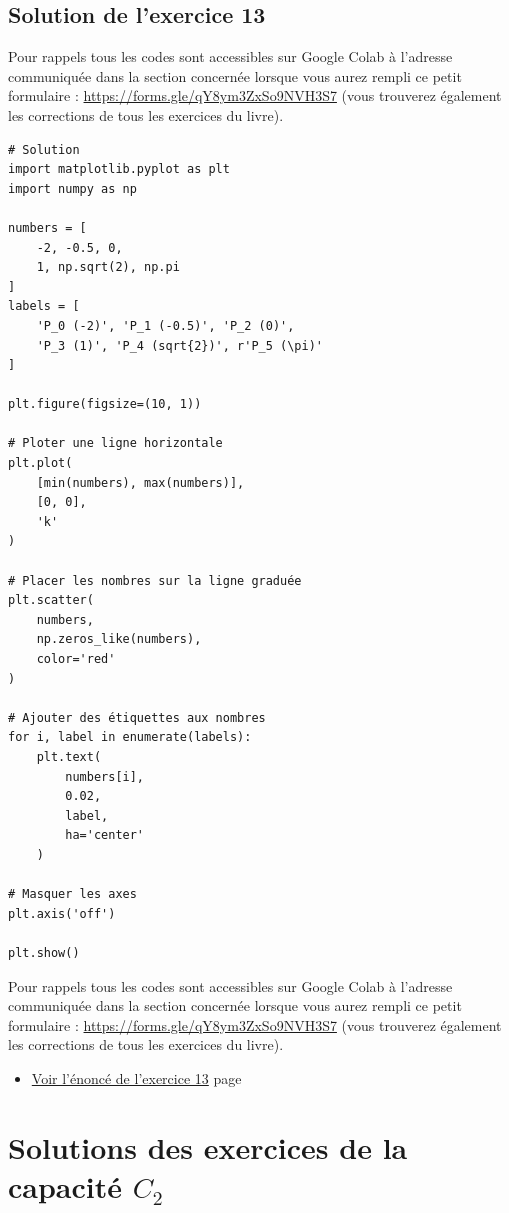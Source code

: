 \documentclass[a4paper,11pt]{book}
\begin{document}
\clearpage

\section{Solution de l'exercice 13}
\label{sec:orge81c56c}
\label{orgcc6458f}
\label{page:sec9.1.1sols13}


Pour rappels tous les codes sont accessibles sur Google Colab à
l'adresse communiquée dans la section concernée lorsque vous
aurez rempli ce petit formulaire : \url{https://forms.gle/qY8ym3ZxSo9NVH3S7}
(vous trouverez également les corrections de tous les exercices du
livre).


\clearpage


\begin{verbatim}
# Solution
import matplotlib.pyplot as plt
import numpy as np

numbers = [
    -2, -0.5, 0,
    1, np.sqrt(2), np.pi
]
labels = [
    'P_0 (-2)', 'P_1 (-0.5)', 'P_2 (0)',
    'P_3 (1)', 'P_4 (sqrt{2})', r'P_5 (\pi)'
]

plt.figure(figsize=(10, 1))

# Ploter une ligne horizontale
plt.plot(
    [min(numbers), max(numbers)],
    [0, 0],
    'k'
)

# Placer les nombres sur la ligne graduée
plt.scatter(
    numbers,
    np.zeros_like(numbers),
    color='red'
)

# Ajouter des étiquettes aux nombres
for i, label in enumerate(labels):
    plt.text(
        numbers[i],
        0.02,
        label,
        ha='center'
    )

# Masquer les axes
plt.axis('off')

plt.show()
\end{verbatim}

\clearpage

Pour rappels tous les codes sont accessibles sur Google Colab à
l'adresse communiquée dans la section concernée lorsque vous
aurez rempli ce petit formulaire : \url{https://forms.gle/qY8ym3ZxSo9NVH3S7}
(vous trouverez également les corrections de tous les exercices du
livre).


\begin{itemize}
\item \hyperref[org6da0729]{Voir l'énoncé de l'exercice 13}
page~\pageref{page:sec3.2.2exo13}
\end{itemize}


\clearpage
\chapter{Solutions des exercices de la capacité \(C_2\)}
\label{sec:org0e2621a}
\label{org890787c}
\label{page:sec9.2sols-capacity2}
\end{document}
